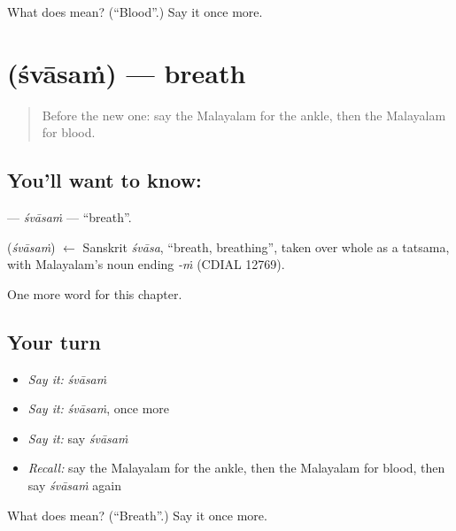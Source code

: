 \begin{tcolorbox}[breakable,colback=teal!4,colframe=teal!35!black,title={Before you move on}]
What does  mean? (\textquotedblleft{}Blood\textquotedblright{}.) Say it once more.
\end{tcolorbox}
\section[\texorpdfstring{\ml{ശ്വാസം} (śvāsaṁ)}{ശ്വാസം (śvāsaṁ)}]{ (śvāsaṁ) — breath}

\label{lesson:ML-C233-svasam}



\begin{quote}
Before the new one: say the Malayalam for the ankle, then the Malayalam for blood.
\end{quote}

\subsection*{You'll want to know: }
\textbf{} — \emph{śvāsaṁ} — \textquotedblleft{}breath\textquotedblright{}.

\begin{cousinweb}
\textbf{} (\emph{śvāsaṁ}) $\leftarrow$ Sanskrit \emph{śvāsa}, \textquotedblleft{}breath, breathing\textquotedblright{}, taken over whole as a tatsama, with Malayalam's noun ending \emph{-ṁ} (CDIAL 12769).
\end{cousinweb}

\begin{grammarlens}[title={What you've built}]
One more word for this chapter.
\end{grammarlens}

\subsection*{Your turn}
\begin{itemize}
\raggedright
  \item \emph{Say it:} \emph{śvāsaṁ}
  \item \emph{Say it:} \emph{śvāsaṁ}, once more
  \item \emph{Say it:} say \emph{śvāsaṁ}
  \item \emph{Recall:} say the Malayalam for the ankle, then the Malayalam for blood, then say \emph{śvāsaṁ} again
\end{itemize}

\begin{tcolorbox}[breakable,colback=teal!4,colframe=teal!35!black,title={Before you move on}]
What does  mean? (\textquotedblleft{}Breath\textquotedblright{}.) Say it once more.
\end{tcolorbox}
